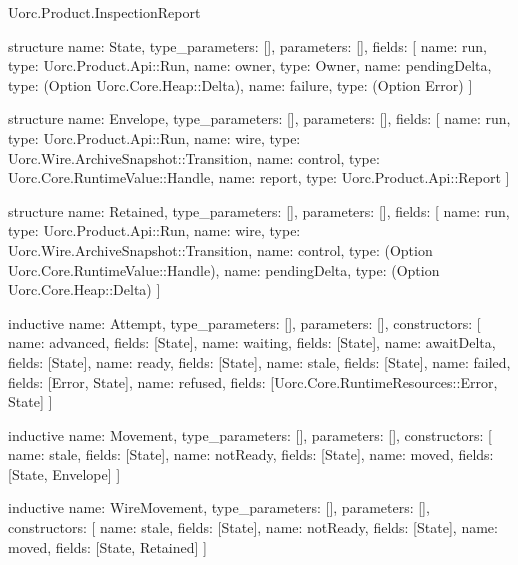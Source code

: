 \begin{lexlean}{Uorc.Product.InspectionReport}
\begin{semanticmodule}
structure{
  name: State,
  type_parameters: [],
  parameters: [],
  fields: [
    {name: run, type: Uorc.Product.Api::Run},
    {name: owner, type: Owner},
    {name: pendingDelta, type: (Option Uorc.Core.Heap::Delta)},
    {name: failure, type: (Option Error)}
  ]
}

structure{
  name: Envelope,
  type_parameters: [],
  parameters: [],
  fields: [
    {name: run, type: Uorc.Product.Api::Run},
    {name: wire, type: Uorc.Wire.ArchiveSnapshot::Transition},
    {name: control, type: Uorc.Core.RuntimeValue::Handle},
    {name: report, type: Uorc.Product.Api::Report}
  ]
}

structure{
  name: Retained,
  type_parameters: [],
  parameters: [],
  fields: [
    {name: run, type: Uorc.Product.Api::Run},
    {name: wire, type: Uorc.Wire.ArchiveSnapshot::Transition},
    {name: control, type: (Option Uorc.Core.RuntimeValue::Handle)},
    {name: pendingDelta, type: (Option Uorc.Core.Heap::Delta)}
  ]
}

inductive{
  name: Attempt,
  type_parameters: [],
  parameters: [],
  constructors: [
    {name: advanced, fields: [State]},
    {name: waiting, fields: [State]},
    {name: awaitDelta, fields: [State]},
    {name: ready, fields: [State]},
    {name: stale, fields: [State]},
    {name: failed, fields: [Error, State]},
    {name: refused, fields: [Uorc.Core.RuntimeResources::Error, State]}
  ]
}

inductive{
  name: Movement,
  type_parameters: [],
  parameters: [],
  constructors: [
    {name: stale, fields: [State]},
    {name: notReady, fields: [State]},
    {name: moved, fields: [State, Envelope]}
  ]
}

inductive{
  name: WireMovement,
  type_parameters: [],
  parameters: [],
  constructors: [
    {name: stale, fields: [State]},
    {name: notReady, fields: [State]},
    {name: moved, fields: [State, Retained]}
  ]
}


\end{semanticmodule}
\end{lexlean}
